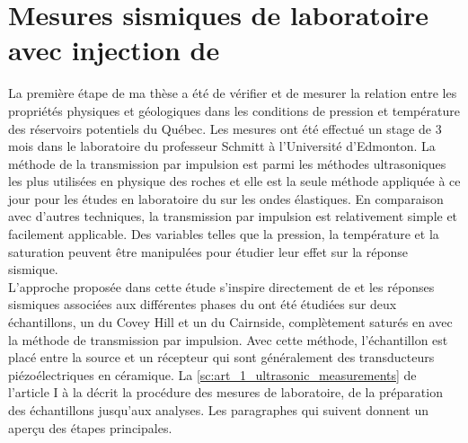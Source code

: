 \section{Mesures sismiques de laboratoire avec injection de
\texorpdfstring{}{CO2}}
\label{sc:laboratoire}
La première étape de ma thèse a été de vérifier et de mesurer la relation entre
les propriétés physiques et géologiques dans les conditions de pression et
température des réservoirs potentiels du Québec. Les mesures ont été
 effectué un stage de 3 mois dans le laboratoire du professeur Schmitt à
l'Université d'Edmonton.
La méthode de la transmission par impulsion est parmi les méthodes ultrasoniques
les plus utilisées en physique des roches \citep{Wyllie1958,Nur1971,Timur1977,Toksz1979,Tosaya1982,Blair1990,Wang1991,Cadoret1995,Adam2006,Verwer2008,Yam2011,Njiekak2013,Schmitt2015}
et elle est la seule méthode appliquée à ce jour pour les études en laboratoire
du  sur les ondes élastiques. En comparaison avec d'autres techniques,
la transmission par impulsion est relativement simple et facilement applicable.
Des variables telles que la pression, la température et la saturation peuvent
être manipulées pour étudier leur effet sur la réponse sismique. \\
L'approche proposée dans cette étude s'inspire directement de
\citet{Schmitt2015} et les réponses sismiques associées aux différentes phases
du  ont été étudiées sur deux échantillons, un du Covey Hill et un du Cairnside,
complètement saturés en  avec la méthode de transmission par impulsion.
Avec cette méthode, l'échantillon est placé entre la source et un récepteur qui
sont généralement des transducteurs piézoélectriques en céramique. La
\cref{sc:art_1_ultrasonic_measurements} de l'article I à la
 décrit la procédure des mesures de
laboratoire, de la préparation des échantillons jusqu'aux analyses. Les
paragraphes qui suivent donnent un aperçu des étapes principales.
